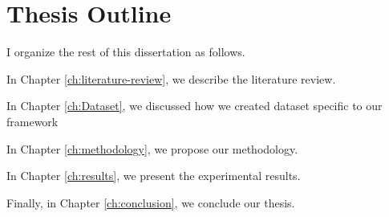\pagebreak

\section{Thesis Outline}

I organize the rest of this dissertation as follows.

In Chapter \ref{ch:literature-review}, we describe the literature review.

In Chapter \ref{ch:Dataset}, we discussed how we created dataset specific to our framework

In Chapter \ref{ch:methodology}, we propose our methodology.

In Chapter \ref{ch:results}, we present the experimental results.

Finally, in Chapter \ref{ch:conclusion}, we conclude our thesis.

\FloatBarrier

